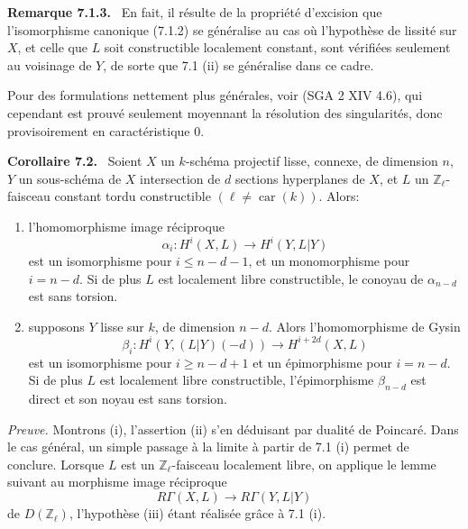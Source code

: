 \documentclass[11pt]{article}
\newenvironment{statement}[1]{\par\medskip\noindent\textbf{#1.}\ }{\par\medskip}
\begin{document}
\begin{statement}{Remarque 7.1.3}
En fait, il résulte de la propriété d'excision que l'isomorphisme canonique (7.1.2) se généralise au cas où l'hypothèse de lissité sur $X$, et celle que $L$ soit constructible localement constant, sont vérifiées seulement au voisinage de $Y$, de sorte que 7.1 (ii) se généralise dans ce cadre.

Pour des formulations nettement plus générales, voir (SGA 2 XIV 4.6), qui cependant est prouvé seulement moyennant la résolution des singularités, donc provisoirement en caractéristique $0$.
\end{statement}

\begin{statement}{Corollaire 7.2}
Soient $X$ un $k$-schéma projectif lisse, connexe, de dimension $n$, $Y$ un sous-schéma de $X$ intersection de $d$ sections hyperplanes de $X$, et $L$ un $\mathbb Z_\ell$-faisceau constant tordu constructible $(\ell\ne\operatorname{car}(k))$. Alors:
\begin{enumerate}[label=(\roman*)]
\item l'homomorphisme image réciproque
\[
\alpha_i:H^i(X,L)\to H^i(Y,L|Y)
\]
est un isomorphisme pour $i\le n-d-1$, et un monomorphisme pour $i=n-d$. Si de plus $L$ est localement libre constructible, le conoyau de $\alpha_{n-d}$ est sans torsion.
\item supposons $Y$ lisse sur $k$, de dimension $n-d$. Alors l'homomorphisme de Gysin
\[
\beta_i:H^i(Y,(L|Y)(-d))\to H^{i+2d}(X,L)
\]
est un isomorphisme pour $i\ge n-d+1$ et un épimorphisme pour $i=n-d$. Si de plus $L$ est localement libre constructible, l'épimorphisme $\beta_{n-d}$ est direct et son noyau est sans torsion.
\end{enumerate}
\end{statement}

\emph{Preuve.} Montrons (i), l'assertion (ii) s'en déduisant par dualité de Poincaré. Dans le cas général, un simple passage à la limite à partir de 7.1 (i) permet de conclure. Lorsque $L$ est un $\mathbb Z_\ell$-faisceau localement libre, on applique le lemme suivant au morphisme image réciproque
\[
R\Gamma(X,L)\to R\Gamma(Y,L|Y)
\]
de $D(\mathbb Z_\ell)$, l'hypothèse (iii) étant réalisée grâce à 7.1 (i).
\end{document}

